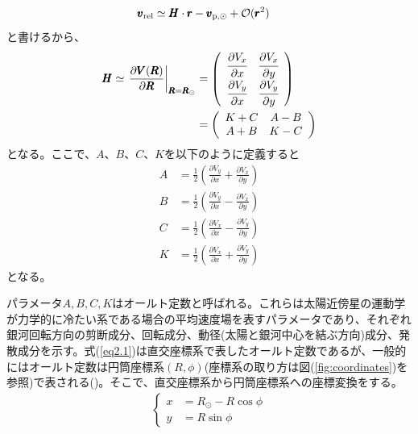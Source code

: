 \begin{align}
\begin{aligned}
	\pmb{v}_{\rm rel} &\simeq \pmb{H} \cdot \pmb{r} - \pmb{v}_{\mathrm{p},\odot} + \mathcal{O}(\pmb{r}^2) \label{eq:1}
\end{aligned}
\end{align}
と書けるから、
\begin{align}
\begin{aligned}
	\pmb{H} \simeq
	\left. \frac{\partial \pmb{V}(\pmb{R})}{\partial \pmb{R}} \right|_{\pmb{R}=\pmb{R}_{\odot}}
	&=
	\left(
	\begin{array}{cc}
	 	\cfrac{\partial V_x}{\partial x} & \cfrac{\partial V_x}{\partial y}\\
		\cfrac{\partial V_y}{\partial x} & \cfrac{\partial V_y}{\partial y}\\
	\end{array}
	\right) \\
	&=
	\left(
	\begin{array}{cc}
	 	K+C & A-B\\
		A+B & K-C\\
	\end{array}
	\right)
\end{aligned} \label{eq2}
\end{align}
となる。ここで、$A、B、C、K$を以下のように定義すると
\begin{subequations}
\begin{align}
	A &=\frac{1}{2}\left(\frac{\partial V_y}{\partial x} + \frac{\partial V_x}{\partial y}\right) \label{eq2.1a}\\
	B &=\frac{1}{2}\left(\frac{\partial V_y}{\partial x} - \frac{\partial V_x}{\partial y}\right) \label{eq2.1b}\\
	C &=\frac{1}{2}\left(\frac{\partial V_x}{\partial x} - \frac{\partial V_y}{\partial y}\right) \label{eq2.1c}\\
	K &=\frac{1}{2}\left(\frac{\partial V_x}{\partial x} + \frac{\partial V_y}{\partial y}\right) \label{eq2.1d}
\end{align} \label{eq2.1}
\end{subequations}
となる。

パラメータ$A,B,C,K$はオールト定数と呼ばれる。これらは太陽近傍星の運動学が力学的に冷たい系である場合の平均速度場を表すパラメータであり、それぞれ銀河回転方向の剪断成分、回転成分、動径(太陽と銀河中心を結ぶ方向)成分、発散成分を示す。式(\ref{eq2.1})は直交座標系で表したオールト定数であるが、一般的にはオールト定数は円筒座標系$(R,\phi)$(座標系の取り方は図(\ref{fig:coordinates})を参照)で表される(\cite{Chandra42})。そこで、直交座標系から円筒座標系への座標変換をする。
\begin{align}
\begin{cases}
	x &= R_{\odot} - R\cos{\phi}\\
	y &= R\sin{\phi}
\end{cases}
\end{align}


